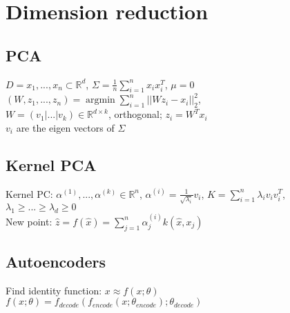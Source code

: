 \section*{Dimension reduction}
\subsection*{PCA}
$D={x_1,...,x_n} \subset \mathbb{R}^d$,
$\Sigma = \frac{1}{n}\sum_{i=1}^n x_i x_i^T$, $\mu = 0$\\
$(W,z_1,...,z_n) = \operatorname{argmin} \sum_{i=1}^n||W z_i - x_i||_2^2$,\\
$W = (v_1|...|v_k) \in \mathbb{R}^{d \times k}$, orthogonal; $z_i = W^T x_i$ \\ 
$v_i$ are the eigen vectors of $\Sigma$

\subsection*{Kernel PCA}
Kernel PC: $\alpha^{(1)},...,\alpha^{(k)}\in \mathbb{R}^n$, $\alpha^{(i)} = \frac{1}{\sqrt{\lambda_i}}v_i$, $K = \sum_{i=1}^n \lambda_i v_i v_i^T$, $\lambda_1 \geq ... \geq \lambda_d \geq 0$\\
New point: $\hat{z} = f(\hat{x}) = \sum_{j=1}^n\alpha_j^{(i)}k(\hat{x},x_j)$

\subsection*{Autoencoders}
Find identity function: $x \approx f(x;\theta)$\\
$f(x;\theta) = f_{decode}(f_{encode}(x;\theta_{encode});\theta_{decode})$